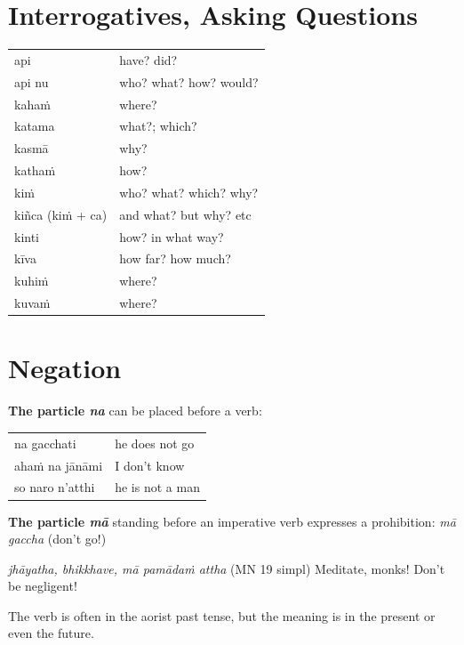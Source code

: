 \documentclass[11pt,oneside]{memoir}
\begin{document}
\section{Interrogatives, Asking Questions}
\label{sec:orge6158f5}

\begin{center}
\begin{tabular}{ll}
api & have? did?\\[0pt]
api nu & who? what? how? would?\\[0pt]
kahaṁ & where?\\[0pt]
katama & what?; which?\\[0pt]
kasmā & why?\\[0pt]
kathaṁ & how?\\[0pt]
kiṁ & who? what? which? why?\\[0pt]
kiñca (kiṁ + ca) & and what? but why? etc\\[0pt]
kinti & how? in what way?\\[0pt]
kīva & how far? how much?\\[0pt]
kuhiṁ & where?\\[0pt]
kuvaṁ & where?\\[0pt]
\end{tabular}
\end{center}

\section{Negation}
\label{sec:orga4feb9a}

\textbf{The particle \emph{na}} can be placed before a verb:

\begin{center}
\begin{tabular}{ll}
na gacchati & he does not go\\[0pt]
ahaṁ na jānāmi & I don't know\\[0pt]
so naro n'atthi & he is not a man\\[0pt]
\end{tabular}
\end{center}

\textbf{The particle \emph{mā}} standing before an imperative verb expresses a prohibition: \emph{mā gaccha} (don't go!)

\emph{jhāyatha, bhikkhave, mā pamādaṁ attha} (MN 19 simpl) Meditate, monks! Don’t be negligent!

The verb is often in the aorist past tense, but the meaning is in the present or even the future.
\end{document}
